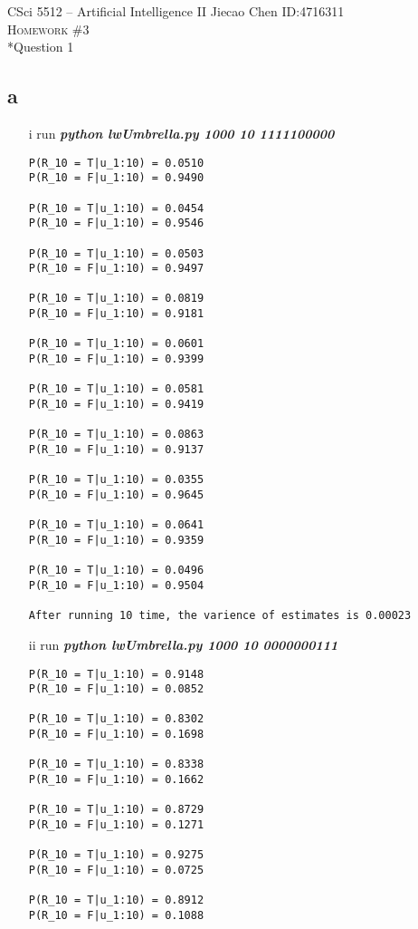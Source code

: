 \documentclass[12pt]{amsart}
\makeatletter
\renewcommand{\section}{\@startsection{section}{1}{0mm}
{-\baselineskip}{0.5\baselineskip}{\bf\leftline}}
\makeatother
\begin{document}
\noindent CSci 5512 -- Artificial Intelligence II \hfill Jiecao Chen \hfill ID:4716311 \\
\textsc{Homework \#3 }\\

\section*{Question 1} 
\subsection*{a}
\begin{itemize}
\item[i] run \textit{\textbf{python lwUmbrella.py 1000 10 1111100000}}
\begin{verbatim}
P(R_10 = T|u_1:10) = 0.0510
P(R_10 = F|u_1:10) = 0.9490

P(R_10 = T|u_1:10) = 0.0454
P(R_10 = F|u_1:10) = 0.9546

P(R_10 = T|u_1:10) = 0.0503
P(R_10 = F|u_1:10) = 0.9497

P(R_10 = T|u_1:10) = 0.0819
P(R_10 = F|u_1:10) = 0.9181

P(R_10 = T|u_1:10) = 0.0601
P(R_10 = F|u_1:10) = 0.9399

P(R_10 = T|u_1:10) = 0.0581
P(R_10 = F|u_1:10) = 0.9419

P(R_10 = T|u_1:10) = 0.0863
P(R_10 = F|u_1:10) = 0.9137

P(R_10 = T|u_1:10) = 0.0355
P(R_10 = F|u_1:10) = 0.9645

P(R_10 = T|u_1:10) = 0.0641
P(R_10 = F|u_1:10) = 0.9359

P(R_10 = T|u_1:10) = 0.0496
P(R_10 = F|u_1:10) = 0.9504

After running 10 time, the varience of estimates is 0.00023
\end{verbatim}
\item[ii] run \textit{\textbf{python lwUmbrella.py 1000 10 0000000111}}
\begin{verbatim}
P(R_10 = T|u_1:10) = 0.9148
P(R_10 = F|u_1:10) = 0.0852

P(R_10 = T|u_1:10) = 0.8302
P(R_10 = F|u_1:10) = 0.1698

P(R_10 = T|u_1:10) = 0.8338
P(R_10 = F|u_1:10) = 0.1662

P(R_10 = T|u_1:10) = 0.8729
P(R_10 = F|u_1:10) = 0.1271

P(R_10 = T|u_1:10) = 0.9275
P(R_10 = F|u_1:10) = 0.0725

P(R_10 = T|u_1:10) = 0.8912
P(R_10 = F|u_1:10) = 0.1088


\end{verbatim}
\end{itemize}
\end{document}

